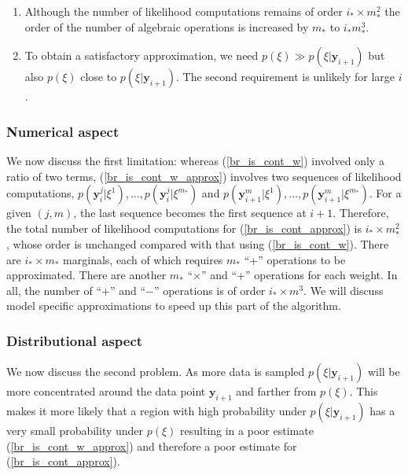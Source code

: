 \documentclass[11pt]{article}
\begin{document}
\begin{enumerate}
\item Although the number of likelihood computations remains of order $i_*\times m_*^2$ the order of the number of algebraic operations is increased by $m_*$ to $i_*m_*^3$. 
\item To obtain a satisfactory approximation, we need  $p(\xi)\gg p(\xi|\mathbf{y}_{i+1})$ but also 
$p(\xi)$ close to $p(\xi|\mathbf{y}_{i+1})$. The second requirement is unlikely for large $i$.
\end{enumerate}
\subsubsection{Numerical aspect}
We now discuss the first limitation: whereas (\ref{br_is_cont_w}) involved only a ratio of two terms, (\ref{br_is_cont_w_approx}) involves two sequences of likelihood computations, $p(\mathbf{y}_i^j|\xi^1),...,p(\mathbf{y}_i^j|\xi^{m_*})$ and $p(\mathbf{y}_{i+1}^m|\xi^1),...,p(\mathbf{y}_{i+1}^m|\xi^{m_*})$. For a given $(j,m)$, the last sequence becomes the first sequence at $i+1$. Therefore, the total number of likelihood computations for (\ref{br_is_cont_approx}) is $i_*\times m_*^2$, whose order is unchanged compared with that using (\ref{br_is_cont_w}). There are $i_*\times m_*$ marginals, each of which requires $m_*$ ``+'' operations to be approximated. There are another $m_*$ ``$\times$'' and ``+'' operations for each weight. In all, the number of ``+'' and ``$-$'' operations is of order $i_*\times m^3$. We will discuss model specific approximations to speed up this part of the algorithm.

\subsubsection{Distributional aspect}
We now discuss the second problem. As more data is sampled $p(\xi|\mathbf{y}_{i+1})$ will be more concentrated around the data point $\mathbf{y}_{i+1}$ and farther from $p(\xi)$. This makes it more likely that a region with high probability under $p(\xi|\mathbf{y}_{i+1})$ has a very small probability under $p(\xi)$ resulting in a poor estimate (\ref{br_is_cont_w_approx}) and therefore a poor estimate for (\ref{br_is_cont_approx}).
\end{document}
